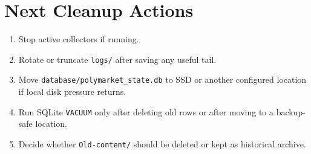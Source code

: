 \documentclass{article}
\begin{document}
\section*{Next Cleanup Actions}
\begin{enumerate}[nosep]
\item Stop active collectors if running.
\item Rotate or truncate \texttt{logs/} after saving any useful tail.
\item Move \texttt{database/polymarket\_state.db} to SSD or another configured location if local disk pressure returns.
\item Run SQLite \texttt{VACUUM} only after deleting old rows or after moving to a backup-safe location.
\item Decide whether \texttt{Old-content/} should be deleted or kept as historical archive.
\end{enumerate}
\end{document}

